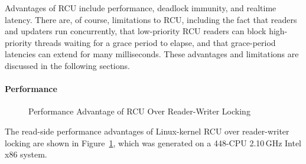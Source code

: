 Advantages of RCU include performance,
deadlock immunity, and realtime latency.
There are, of course, limitations to RCU, including the fact that
readers and updaters run concurrently, that low-priority RCU readers
can block high-priority threads waiting for a grace period to elapse,
and that grace-period latencies can extend for many milliseconds.
These advantages and limitations are discussed in the following sections.

\paragraph{Performance}

\begin{figure}[tb]
\centering
{}
\caption{Performance Advantage of RCU Over Reader-Writer Locking}
\label{fig:defer:Performance Advantage of RCU Over Reader-Writer Locking}
\end{figure}

The read-side performance advantages of Linux-kernel RCU over
reader-writer locking are shown in
Figure~\ref{fig:defer:Performance Advantage of RCU Over Reader-Writer Locking},
which was generated on a 448-CPU 2.10\,GHz Intel x86 system.

